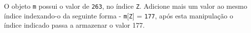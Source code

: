 \documentclass[12pt,varwidth=16cm,border=1pt]{standalone}
\begin{document}
O objeto \verb+m+ possui o valor de \verb+263+, no índice \verb+Z+. Adicione mais um valor ao mesmo índice indexando-o da seguinte forma - \verb+m+[\verb+Z+] = \verb+177+, após esta manipulação o índice indicado  passa a armazenar o valor 177.

\questiomfalse
\end{document}
